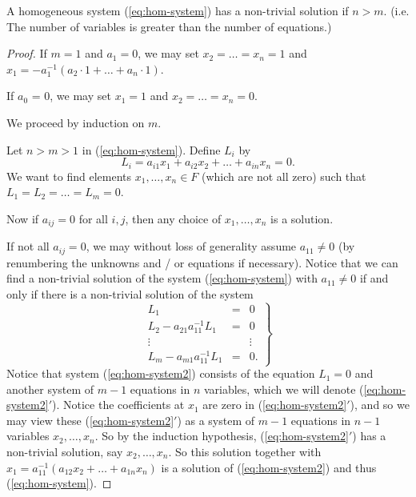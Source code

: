 \begin{theorem} \label{thm:1}
	A homogeneous system (\ref{eq:hom-system}) has a non-trivial solution if $n > m$. (i.e. The number of variables is greater than the number of equations.)
	\begin{proof}
		If $m = 1$ and $a_1 = 0$, we may set $x_2 = \ldots = x_n = 1$ and $x_1 = -a_1^{-1}(a_2 \cdot 1 + \ldots + a_n \cdot 1)$.
		
		If $a_0$ = 0, we may set $x_1 = 1$ and $x_2 = \ldots = x_n = 0$.
		
		We proceed by induction on $m$.
		
		Let $n > m > 1$ in (\ref{eq:hom-system}). Define $L_i$ by
		\[
			L_i = a_{i 1} x_1 + a_{i 2} x_2 + \ldots + a_{i n} x_n = 0.
		\]
		We want to find elements $x_1, \ldots, x_n \in F$ (which are not all zero) such that $L_1 = L_2 = \ldots = L_m = 0$.
		
		Now if $a_{i j} = 0$ for all $i, j$, then any choice of $x_1, \ldots, x_n$ is a solution.
		
		If not all $a_{i j} = 0$, we may without loss of generality assume $a_{1 1} \neq 0$ (by renumbering the unknowns and / or equations if necessary). Notice that we can find a non-trivial solution of the system (\ref{eq:hom-system}) with $a_{1 1} \neq 0$ if and only if there is a non-trivial solution of the system
		\begin{equation} \label{eq:hom-system2}
			\left.
			\begin{matrix}
				L_1							 &=& 0 \\
				L_2 - a_{21} a_{11}^{-1} L_1 &=& 0 \\
				\vdots						 & & \vdots \\
				L_m - a_{m1} a_{11}^{-1} L_1 &=& 0.
			\end{matrix}
			\right\}
		\end{equation}
		Notice that system (\ref{eq:hom-system2}) consists of the equation $L_1 = 0$ and another system of $m - 1$ equations in $n$ variables, which we will denote (\ref{eq:hom-system2}$'$). Notice the coefficients at $x_1$ are zero in (\ref{eq:hom-system2}$'$), and so we may view these (\ref{eq:hom-system2}$'$) as a system of $m - 1$ equations in $n - 1$ variables $x_2, \ldots, x_n$. So by the induction hypothesis, (\ref{eq:hom-system2}$'$) has a non-trivial solution, say $x_2, \ldots, x_n$. So this solution together with $x_1 = a_{11}^{-1}(a_{12}x_2 + \ldots + a_{1n}x_n)$ is a solution of (\ref{eq:hom-system2}) and thus (\ref{eq:hom-system}).
	\end{proof}
\end{theorem}

